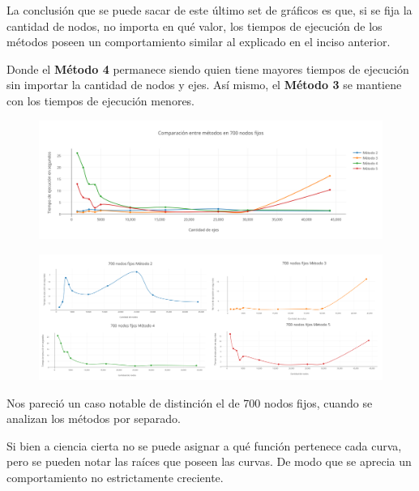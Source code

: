La conclusi\'on que se puede sacar de este \'ultimo set de gr\'aficos es que, si se fija la cantidad de nodos, no importa en qu\'e valor, los tiempos de ejecuci\'on de los m\'etodos poseen un comportamiento similar al explicado en el inciso anterior.

Donde el \textbf{M\'etodo 4} permanece siendo quien tiene mayores tiempos de ejecuci\'on sin importar la cantidad de nodos y ejes. As\'i mismo, el \textbf{M\'etodo 3} se mantiene con los tiempos de ejecuci\'on menores.

\newpage
  \begin{figure}[h!]
   \begin{center}
 	\includegraphics[scale=0.55]{imagenes/local/tiempos/700nodos.png}
   \end{center}
 \end{figure} 
 
   \begin{figure}[h!]
   \begin{center}
 	\includegraphics[scale=0.08]{imagenes/local/tiempos/700nodos2.png}
   \end{center}
 \end{figure} 
 
Nos pareci\'o un caso notable de distinci\'on el de 700 nodos fijos, cuando se analizan los m\'etodos por separado. 

Si bien a ciencia cierta no se puede asignar a qu\'e funci\'on pertenece cada curva, pero se pueden notar las ra\'ices que poseen las curvas. De modo que se aprecia un comportamiento no estrictamente creciente. 

